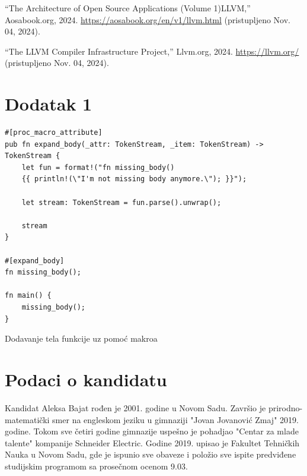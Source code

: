 \documentclass[11pt]{article}
\begin{document}
\begin{thebibliography}
    “The Architecture of Open Source Applications (Volume 1)LLVM,” Aosabook.org, 2024. 
    \url{https://aosabook.org/en/v1/llvm.html} (pristupljeno Nov. 04, 2024).

    “The LLVM Compiler Infrastructure Project,” Llvm.org, 2024. 
    \url{https://llvm.org/} (pristupljeno Nov. 04, 2024).
\end{thebibliography}

\newpage
\section{Dodatak 1}

\begin{listing}[H]
\begin{verbatim}
#[proc_macro_attribute]
pub fn expand_body(_attr: TokenStream, _item: TokenStream) -> TokenStream {
    let fun = format!("fn missing_body() 
    {{ println!(\"I'm not missing body anymore.\"); }}");

    let stream: TokenStream = fun.parse().unwrap();

    stream
}

#[expand_body]
fn missing_body();

fn main() {
    missing_body();
}
\end{verbatim}
\caption{Dodavanje tela funkcije uz pomoć makroa}
\label{lst:bonus_body_expand}
\end{listing}


\newpage
\section{Podaci o kandidatu}


Kandidat Aleksa Bajat rođen je 2001. godine u Novom Sadu. Završio je prirodno-matematički smer na engleskom jeziku 
u gimnaziji "Jovan Jovanović Zmaj" 2019. godine. Tokom sve četiri godine gimnazije uspešno je pohadjao 
"Centar za mlade talente" kompanije Schneider Electric.  Godine 2019. upisao je Fakultet 
Tehničkih Nauka u Novom Sadu, gde je ispunio sve obaveze i položio sve ispite predviđene 
studijskim programom sa prosečnom ocenom 9.03.
\end{document}
